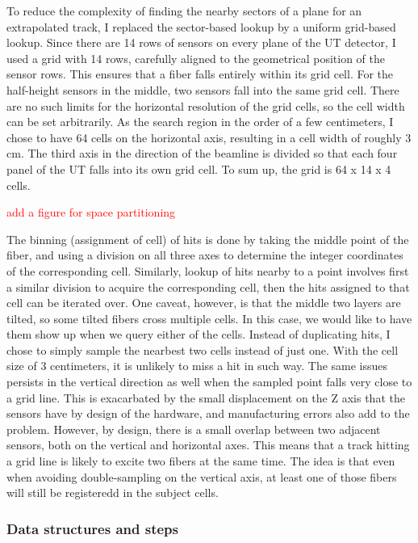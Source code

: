 \documentclass[12pt]{article}
\begin{document}
To reduce the complexity of finding the nearby sectors of a plane for an extrapolated track, I replaced the sector-based lookup by a uniform grid-based lookup. Since there are 14  rows of sensors on every plane of the UT detector, I used a grid with 14 rows, carefully aligned to the geometrical position of the sensor rows. This ensures that a fiber falls entirely within its grid cell. For the half-height sensors in the middle, two sensors fall into the same grid cell. There are no such limits for the horizontal resolution of the grid cells, so the cell width can be set arbitrarily. As the search region in the order of a few centimeters, I chose to have 64 cells on the horizontal axis, resulting in a cell width of roughly 3 cm. The third axis in the direction of the beamline is divided so that each four panel of the UT falls into its own grid cell. To sum up, the grid is 64 x 14 x 4 cells.

\textcolor{red}{add a figure for space partitioning}

The binning (assignment of cell) of hits is done by taking the middle point of the fiber, and using a division on all three axes to determine the integer coordinates of the corresponding cell.
Similarly, lookup of hits nearby to a point involves first a similar division to acquire the corresponding cell, then the hits assigned to that cell can be iterated over. One caveat, however, is that the middle two layers are tilted, so some tilted fibers cross multiple cells. In this case, we would like to have them show up when we query either of the cells. Instead of duplicating hits, I chose to simply sample the nearbest two cells instead of just one. With the cell size of 3 centimeters, it is unlikely to miss a hit in such way. The same issues persists in the vertical direction as well when the sampled point falls very close to a grid line. This is exacarbated by the small displacement on the Z axis that the sensors have by design of the hardware, and manufacturing errors also add to the problem. However, by design, there is a small overlap between two adjacent sensors, both on the vertical and horizontal axes. This means that a track hitting a grid line is likely to excite two fibers at the same time. The idea is that even when avoiding double-sampling on the vertical axis, at least one of those fibers will still be registeredd in the subject cells.

\subsubsection{Data structures and steps}
\end{document}
